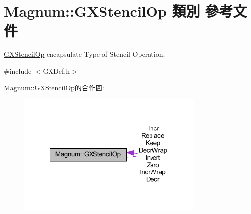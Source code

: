 \hypertarget{class_magnum_1_1_g_x_stencil_op}{}\section{Magnum\+:\+:G\+X\+Stencil\+Op 類別 參考文件}
\label{class_magnum_1_1_g_x_stencil_op}


\hyperlink{class_magnum_1_1_g_x_stencil_op}{G\+X\+Stencil\+Op} encapsulate Type of Stencil Operation.  




{\ttfamily \#include $<$G\+X\+Def.\+h$>$}



Magnum\+:\+:G\+X\+Stencil\+Op的合作圖\+:\nopagebreak
\begin{figure}[H]
\begin{center}
\leavevmode
\includegraphics[width=258pt]{class_magnum_1_1_g_x_stencil_op__coll__graph}
\end{center}
\end{figure}
